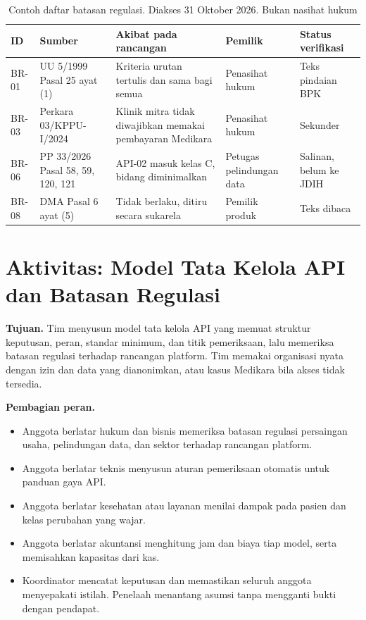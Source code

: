 \begin{table}[!htb]
  \centering
  \caption{Contoh daftar batasan regulasi. Diakses 31 Oktober 2026. Bukan nasihat hukum}
  \label{tab:ch13-daftar-batasan}
  \footnotesize
  \begin{tabularx}{\textwidth}{H{0.95cm}H{2.2cm}GH{1.8cm}H{2.35cm}}
    \hline
    \textbf{ID} & \textbf{Sumber} & \textbf{Akibat pada rancangan} & \textbf{Pemilik} & \textbf{Status verifikasi} \\ \hline
    BR-01 & UU 5/1999 Pasal 25 ayat (1) & Kriteria urutan tertulis dan sama bagi semua & Penasihat hukum & Teks pindaian BPK \\ \hline
    BR-03 & Perkara 03/KPPU-I/2024 & Klinik mitra tidak diwajibkan memakai pembayaran Medikara & Penasihat hukum & Sekunder \\ \hline
    BR-06 & PP 33/2026 Pasal 58, 59, 120, 121 & API-02 masuk kelas C, bidang diminimalkan & Petugas pelindungan data & Salinan, belum ke JDIH \\ \hline
    BR-08 & DMA Pasal 6 ayat (5) & Tidak berlaku, ditiru secara sukarela & Pemilik produk & Teks dibaca \\ \hline
  \end{tabularx}
\end{table}

\section{Aktivitas: Model Tata Kelola API dan Batasan Regulasi}

\textbf{Tujuan.} Tim menyusun model tata kelola API yang memuat struktur keputusan, peran, standar minimum, dan titik pemeriksaan, lalu memeriksa batasan regulasi terhadap rancangan platform. Tim memakai organisasi nyata dengan izin dan data yang dianonimkan, atau kasus Medikara bila akses tidak tersedia.

\textbf{Pembagian peran.}
\begin{itemize}
  \item Anggota berlatar hukum dan bisnis memeriksa batasan regulasi persaingan usaha, pelindungan data, dan sektor terhadap rancangan platform.
  \item Anggota berlatar teknis menyusun aturan pemeriksaan otomatis untuk panduan gaya API.
  \item Anggota berlatar kesehatan atau layanan menilai dampak pada pasien dan kelas perubahan yang wajar.
  \item Anggota berlatar akuntansi menghitung jam dan biaya tiap model, serta memisahkan kapasitas dari kas.
  \item Koordinator mencatat keputusan dan memastikan seluruh anggota menyepakati istilah. Penelaah menantang asumsi tanpa mengganti bukti dengan pendapat.
\end{itemize}

